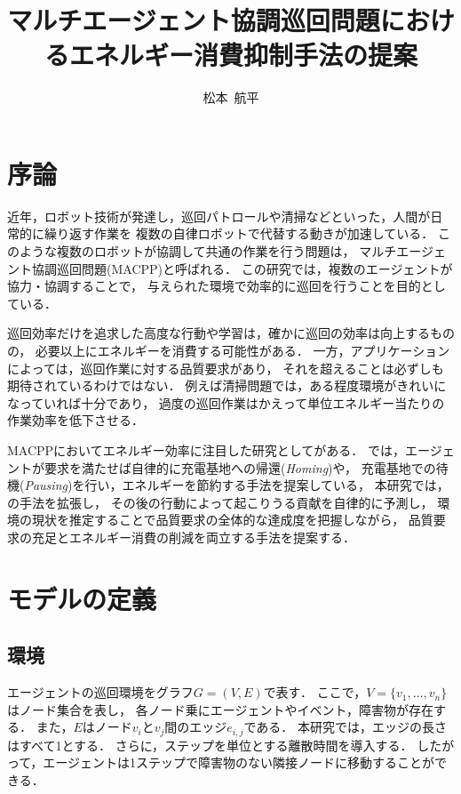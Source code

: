 \documentclass[11pt,a4j,twocolumn]{jarticle}
\title{マルチエージェント協調巡回問題におけるエネルギー消費抑制手法の提案}
\author{松本~航平}
\begin{document}
\maketitle
\section{序論}
近年，ロボット技術が発達し，巡回パトロールや清掃などといった，人間が日常的に繰り返す作業を
複数の自律ロボットで代替する動きが加速している．
このような複数のロボットが協調して共通の作業を行う問題は，
マルチエージェント協調巡回問題(MACPP)と呼ばれる．
この研究では，複数のエージェントが協力・協調することで，
与えられた環境で効率的に巡回を行うことを目的としている．
\par

巡回効率だけを追求した高度な行動や学習は，確かに巡回の効率は向上するものの，
必要以上にエネルギーを消費する可能性がある．
一方，アプリケーションによっては，巡回作業に対する品質要求があり，
それを超えることは必ずしも期待されているわけではない．
例えば清掃問題では，ある程度環境がきれいになっていれば十分であり，
過度の巡回作業はかえって単位エネルギー当たりの作業効率を低下させる．
\par

MACPPにおいてエネルギー効率に注目した研究として\cite{Wu2019}がある．
\cite{Wu2019}では，エージェントが要求を満たせば自律的に充電基地への帰還({\em Homing})や，
充電基地での待機({\em Pausing})を行い，エネルギーを節約する手法を提案している，
本研究では，\cite{Wu2019}の手法を拡張し，
その後の行動によって起こりうる貢献を自律的に予測し，
環境の現状を推定することで品質要求の全体的な達成度を把握しながら，
品質要求の充足とエネルギー消費の削減を両立する手法を提案する．

\section{モデルの定義}
\subsection{環境}
エージェントの巡回環境をグラフ$G = (V,E)$で表す．
ここで，$V = \{v_1, \dots, v_n \}$はノード集合を表し，
各ノード乗にエージェントやイベント，障害物が存在する．
また，$E$はノード$v_i$と$v_j$間のエッジ$e_{i,j}$である．
本研究では，エッジの長さはすべて1とする．
さらに，ステップを単位とする離散時間を導入する．
したがって，エージェントは1ステップで障害物のない隣接ノードに移動することができる．
\par
\end{document}
